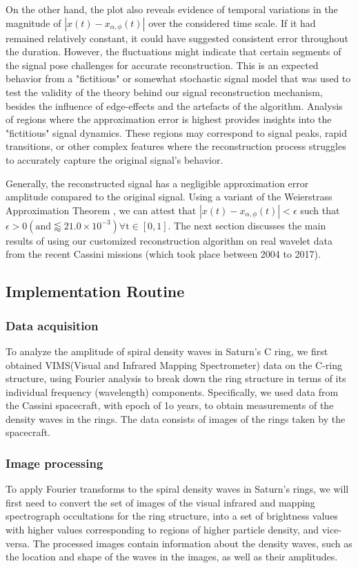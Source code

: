 \documentclass{article}
\begin{document}
On the other hand, the plot also reveals evidence of temporal variations in the magnitude of $|x(t)-x_{\alpha,\phi}(t)|$ over the considered time scale. If it had remained relatively constant, it could have suggested consistent error throughout the duration. However, the fluctuations might indicate that certain segments of the signal pose challenges for accurate reconstruction. This is an expected behavior from a "fictitious" or somewhat stochastic signal model that was used to test the validity of the theory behind our signal reconstruction mechanism, besides the influence of edge-effects and the artefacts of the algorithm. Analysis of regions where the approximation error is highest provides insights into the "fictitious" signal dynamics. These regions may correspond to signal peaks, rapid transitions, or other complex features where the reconstruction process struggles to accurately capture the original signal's behavior.

Generally, the reconstructed signal has a negligible approximation error amplitude compared to the original signal. Using a variant of the Weierstrass Approximation Theorem \cite{pereyra2012harmonic}, we can attest that $|x(t)-x_{\alpha,\phi}(t)| < \epsilon$ such that $\epsilon > 0  (\text{and} \lessapprox 21.0 \times 10^{-3})  \forall  \text{t} \in [0,1]$. The next section discusses the main results of using our customized reconstruction algorithm on real wavelet data from the recent Cassini missions (which took place between 2004 to 2017).  

\subsection{Implementation Routine}
\subsubsection{Data acquisition}
To analyze the amplitude of spiral density waves in Saturn's C ring, we first obtained VIMS(Visual and Infrared Mapping Spectrometer) data on the C-ring structure, using Fourier analysis to break down the ring structure in terms of its individual frequency (wavelength) components. Specifically, we used data from the Cassini spacecraft, with epoch of 1o years, to obtain measurements of the density waves in the rings. The data consists of images of the rings taken by the spacecraft.
\subsubsection{Image processing}
To apply Fourier transforms to the spiral density waves in Saturn's rings, we will first need to convert the set of images of the visual infrared and mapping spectrograph occultations for the ring structure, into a set of brightness values with higher values corresponding to regions of higher particle density, and vice-versa. The processed images contain information about the density waves, such as the location and shape of the waves in the images, as well as their amplitudes.
\end{document}
